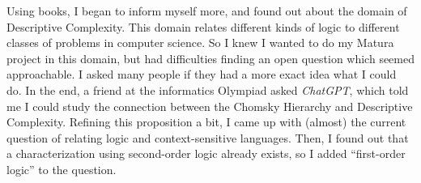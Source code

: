 Using books, I began to inform myself more, and found out about the domain of Descriptive Complexity.
This domain relates different kinds of logic to different classes of problems in computer science.
So I knew I wanted to do my Matura project in this domain, but had difficulties finding an open question which seemed approachable.
I asked many people if they had a more exact idea what I could do.
In the end, a friend at the informatics Olympiad asked \emph{ChatGPT}, which told me I could study the connection between the Chomsky Hierarchy and Descriptive Complexity.
Refining this proposition a bit, I came up with (almost) the current question of relating logic and context-sensitive languages.
Then, I found out that a characterization using second-order logic already exists, so I added ``first-order logic'' to the question.
